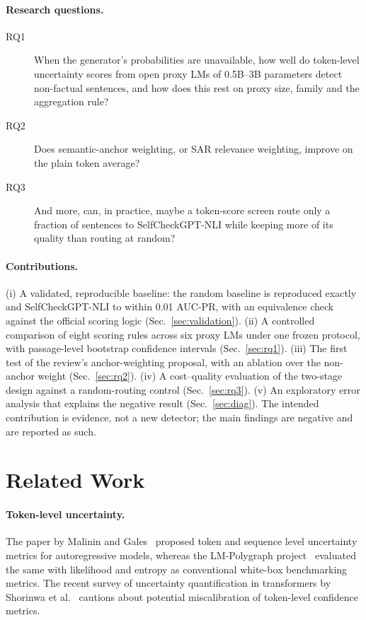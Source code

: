 \documentclass[acmsmall,screen,review,nonacm]{acmart}
\begin{document}
\paragraph{Research questions.}
\begin{description}
  \item[RQ1] When the generator's probabilities are unavailable, how well do token-level uncertainty scores from open proxy LMs of 0.5B--3B parameters detect non-factual sentences, and how does this rest on proxy size, family and the aggregation rule?
  \item[RQ2] Does semantic-anchor weighting, or SAR relevance weighting, improve on the plain token average?
  \item[RQ3] And more, can, in practice, maybe a token-score screen route only a fraction of sentences to SelfCheckGPT-NLI while keeping more of its quality than routing at random?
\end{description}

\paragraph{Contributions.} (i) A validated, reproducible baseline: the random baseline is reproduced exactly and SelfCheckGPT-NLI to within 0.01 AUC-PR, with an equivalence check against the official scoring logic (Sec.~\ref{sec:validation}). (ii) A controlled comparison of eight scoring rules across six proxy LMs under one frozen protocol, with passage-level bootstrap confidence intervals (Sec.~\ref{sec:rq1}). (iii) The first test of the review's anchor-weighting proposal, with an ablation over the non-anchor weight (Sec.~\ref{sec:rq2}). (iv) A cost--quality evaluation of the two-stage design against a random-routing control (Sec.~\ref{sec:rq3}). (v) An exploratory error analysis that explains the negative result (Sec.~\ref{sec:diag}). The intended contribution is evidence, not a new detector; the main findings are negative and are reported as such.

\section{Related Work}
\label{sec:related}

\paragraph{Token-level uncertainty.} The paper by Malinin and Gales~\cite{malinin2021uncertainty} proposed token and sequence level uncertainty metrics for autoregressive models, whereas the LM-Polygraph project~\cite{lmpolygraph} evaluated the same with likelihood and entropy as conventional white-box benchmarking metrics. The recent survey of uncertainty quantification in transformers by Shorinwa et al.~\cite{uqsurvey2025} cautions about potential miscalibration of token-level confidence metrics.
\end{document}
